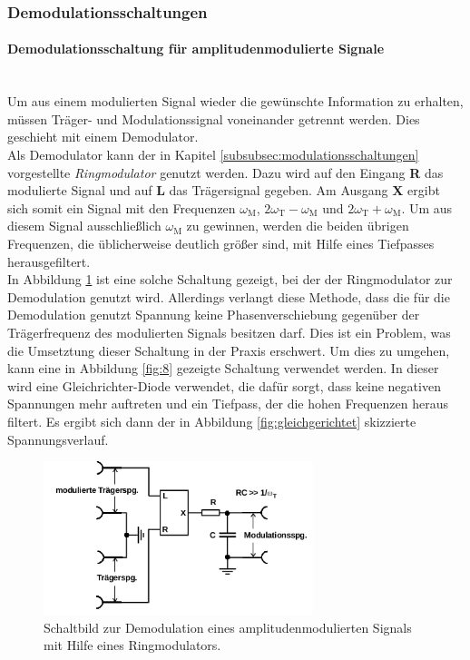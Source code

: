 \FloatBarrier

\subsubsection{Demodulationsschaltungen}
\label{subsubsec:demodulationschaltungen}
\paragraph{Demodulationsschaltung für amplitudenmodulierte Signale}
\mbox{}\\
Um aus einem modulierten Signal wieder die gewünschte Information zu erhalten,
müssen Träger- und Modulationssignal voneinander getrennt werden.
Dies geschieht mit einem Demodulator.\\
Als Demodulator kann der in Kapitel \ref{subsubsec:modulationsschaltungen}
vorgestellte \textit{Ringmodulator} genutzt werden.
Dazu wird auf den Eingang \textbf{R} das modulierte Signal und
auf \textbf{L} das Trägersignal gegeben.
Am Ausgang \textbf{X} ergibt sich somit
ein Signal mit den Frequenzen
$\omega_{\text{M}}$, $2\omega_{\text{T}} - \omega_{\text{M}}$
und $2\omega_{\text{T}} + \omega_{\text{M}}$.
Um aus diesem Signal ausschließlich $\omega_{\text{M}}$ zu gewinnen,
werden die beiden übrigen Frequenzen, die üblicherweise deutlich größer sind,
mit Hilfe eines Tiefpasses herausgefiltert.\\
In Abbildung \ref{fig:7} ist eine solche Schaltung gezeigt,
bei der der Ringmodulator zur Demodulation genutzt wird. Allerdings
verlangt diese Methode, dass die für die Demodulation genutzt
Spannung keine Phasenverschiebung gegenüber der Trägerfrequenz des
modulierten Signals besitzen darf. Dies ist ein Problem, was die Umsetztung dieser
Schaltung in
der Praxis erschwert.
Um dies zu umgehen, kann eine in Abbildung \ref{fig:8} gezeigte
Schaltung verwendet werden. In dieser wird eine Gleichrichter-Diode verwendet,
die dafür sorgt, dass keine negativen Spannungen mehr auftreten und
ein Tiefpass, der die hohen Frequenzen heraus filtert.
Es ergibt sich dann der in Abbildung \ref{fig:gleichgerichtet}
skizzierte Spannungsverlauf.




\begin{figure}
\centering
\includegraphics[width=0.7\textwidth]{figures/demodulator.PNG}
\caption{Schaltbild zur Demodulation eines amplitudenmodulierten Signals mit Hilfe eines Ringmodulators.\cite{sample}}
\label{fig:7}
\end{figure}

